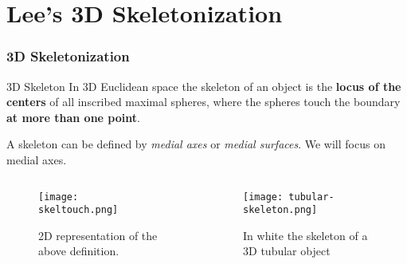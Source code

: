 \section{Lee's 3D Skeletonization}

\begin{frame}
  \frametitle{3D Skeletonization}
  \begin{block}
    {3D Skeleton}
    In 3D Euclidean space the skeleton of an object is the \textbf{locus of the centers} of all inscribed maximal spheres, where the spheres touch the boundary \textbf{at more than one point}.
  \end{block}
  A skeleton can be defined by \emph{medial axes} or \emph{medial surfaces}. We will focus on medial axes.
  \begin{columns}
    \begin{column}{0.5\textwidth}
      \begin{figure}
        \texttt{[image: skeltouch.png]}
        \caption{2D representation of the above definition.}
      \end{figure}
    \end{column}
    \begin{column}{0.5\textwidth}
      \begin{figure}
        \texttt{[image: tubular-skeleton.png]}
        \caption{In white the skeleton of a 3D tubular object}
      \end{figure}
    \end{column}
  \end{columns}
\end{frame}

